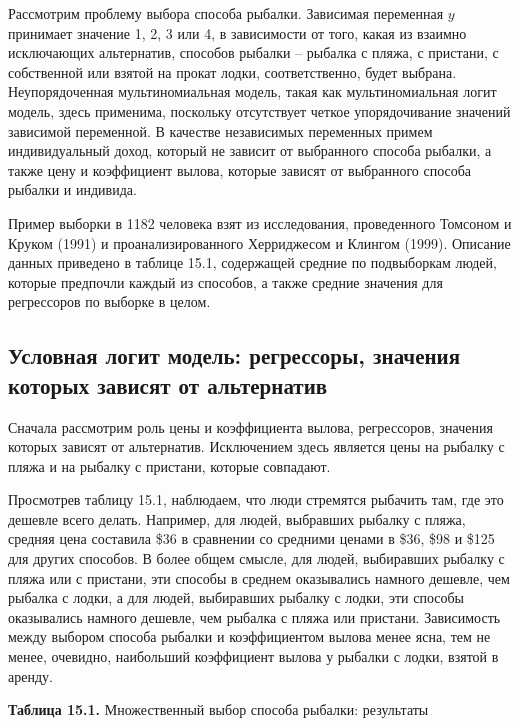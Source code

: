 Рассмотрим проблему выбора способа рыбалки. Зависимая переменная $y$ принимает значение 1, 2, 3 или 4, в зависимости от того, какая из взаимно исключающих альтернатив, способов рыбалки -- рыбалка с пляжа, с пристани, с собственной или взятой на прокат лодки, соответственно, будет выбрана. Неупорядоченная мультиномиальная модель, такая как мультиномиальная логит модель, здесь применима, поскольку отсутствует четкое упорядочивание значений зависимой переменной. В качестве независимых переменных примем индивидуальный доход, который не зависит от выбранного способа рыбалки, а также цену и коэффициент вылова, которые зависят от выбранного способа рыбалки и индивида.

Пример выборки в 1182 человека взят из исследования, проведенного Томсоном и Круком (1991)  и проанализированного Херриджесом и Клингом (1999). Описание данных приведено в таблице 15.1, содержащей средние по подвыборкам людей, которые предпочли каждый из способов, а также средние значения для регрессоров по выборке в целом. 

\subsection{Условная логит модель: регрессоры, значения которых зависят от альтернатив}

Сначала рассмотрим роль цены и коэффициента вылова, регрессоров, значения которых зависят от альтернатив. Исключением здесь является цены на рыбалку с пляжа и на рыбалку с пристани, которые совпадают.

Просмотрев таблицу 15.1, наблюдаем, что люди стремятся рыбачить там, где это дешевле всего делать. Например, для людей, выбравших рыбалку с пляжа, средняя цена составила \$36 в сравнении со средними ценами в \$36, \$98 и \$125 для других способов. В более общем смысле, для людей, выбиравших рыбалку с пляжа или с пристани, эти способы в среднем оказывались намного дешевле, чем рыбалка с лодки, а для людей, выбиравших рыбалку с лодки, эти способы оказывались намного дешевле, чем рыбалка с пляжа или пристани. Зависимость между выбором способа рыбалки и коэффициентом вылова менее ясна, тем не менее, очевидно, наибольший коэффициент вылова у рыбалки с лодки, взятой в аренду.

\textbf{Таблица 15.1. }Множественный выбор способа рыбалки: результаты


